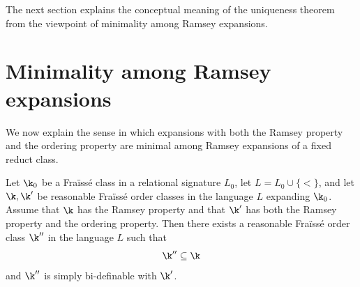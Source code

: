 The next section explains the conceptual meaning of the uniqueness theorem from the viewpoint of minimality among Ramsey expansions.

\section{Minimality among Ramsey expansions}

We now explain the sense in which expansions with both the Ramsey property and the ordering property are minimal among Ramsey expansions of a fixed reduct class.

\begin{theorem}
    \label{thm:minimality-among-ramsey-expansions}
    Let $\k_0$ be a Fra\"iss\'e class in a relational signature $L_0$, let
    \(L=L_0\cup\{<\}\),
    and let $\k,\k'$ be reasonable Fra\"iss\'e order classes in the language $L$ expanding $\k_0$. Assume that $\k$ has the Ramsey property and that $\k'$ has both the Ramsey property and the ordering property. Then there exists a reasonable Fra\"iss\'e order class $\k''$ in the language $L$ such that
    \[
        \k''\subseteq \k
    \]
    and $\k''$ is simply bi-definable with $\k'$.
\end{theorem}

